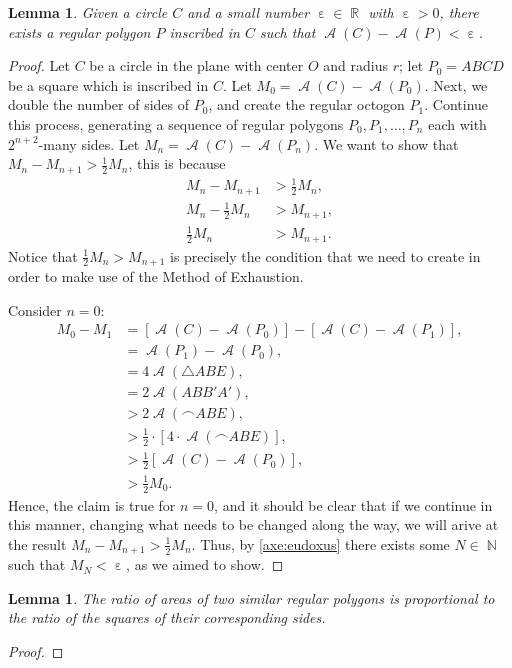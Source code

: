 \documentclass[letterpaper, 12pt]{amsart}
\DeclareMathOperator{\N}{\mathbb{N}}
\DeclareMathOperator{\R}{\mathbb{R}}
\DeclareMathOperator{\A}{\mathcal{A}}
\DeclareMathOperator{\ep}{\varepsilon}
\newtheorem{lemma}[thm]{Lemma}
\theoremstyle{definition}  %
\begin{document}
		\begin{lemma}
		Given a circle $C$ and a small number $\ep \in \R$ with $\ep > 0$, there exists a regular polygon $P$ inscribed in $C$ such that $\A(C) - \A(P) < \ep$.
		\end{lemma}
		\begin{proof}
		Let $C$ be a circle in the plane with center $O$ and radius $r$; let $P_{0} = ABCD$ be a square which is inscribed in $C$.
		Let $M_{0} = \A(C) - \A(P_{0})$.
		Next, we double the number of sides of $P_{0}$, and create the regular octogon $P_{1}$.
		Continue this process, generating a sequence of regular polygons $P_{0}, P_{1}, \dots, P_{n}$ each with $2^{n+2}$-many sides.
		Let $M_{n} = \A(C) - \A(P_{n})$.
		We want to show that $M_{n} - M_{n+1} > \tfrac{1}{2}M_{n}$, this is because 
			\begin{align*}
			M_{n} - M_{n+1} &> \tfrac{1}{2}M_{n}, \\
			M_{n} - \tfrac{1}{2}M_{n} &> M_{n+1}, \\
			\tfrac{1}{2}M_{n} &> M_{n+1}.
			\end{align*}
		Notice that $\tfrac{1}{2}M_{n} > M_{n+1}$ is precisely the condition that we need to create in order to make use of the Method of Exhaustion.

		Consider $n = 0$:
			\begin{align*}
			M_{0} - M_{1} &= [\A(C) - \A(P_{0})] - [\A(C) - \A(P_{1})], \\
			&= \A(P_{1}) - \A(P_{0}), \\
			&= 4 \A(\triangle ABE), \\
			&= 2 \A(ABB'A'), \\
			&> 2 \A(\frown{ABE}), \\
			&> \tfrac{1}{2} \cdot \left[ 4 \cdot \A(\frown{ABE}) \right], \\
			&> \tfrac{1}{2} \left[ \A(C) - \A(P_{0}) \right], \\
			&> \tfrac{1}{2} M_{0}.
			\end{align*}
		Hence, the claim is true for $n=0$, and it should be clear that if we continue in this manner, changing what needs to be changed along the way, we will arive at the result $M_{n} - M_{n+1} > \tfrac{1}{2}M_{n}$.
		Thus, by \ref{axe:eudoxus} there exists some $N \in \N$ such that $M_{N} < \ep$, as we aimed to show.
		\end{proof}

		\begin{lemma}
		The ratio of areas of two similar regular polygons is proportional to the ratio of the squares of their corresponding sides.
		\end{lemma}
		\begin{proof}
		\end{proof}
\end{document}
